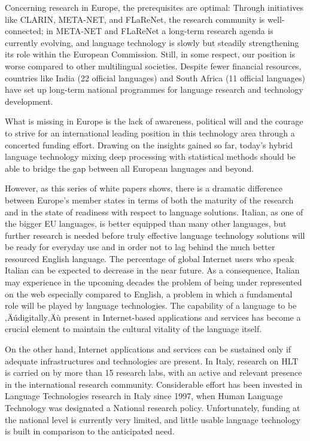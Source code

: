 \begin{multicols}{2}
Concerning research in Europe, the prerequisites are optimal: Through initiatives like CLARIN, META-NET, and FLaReNet, the research community is well-connected; in META-NET and FLaReNet a long-term research agenda is currently evolving, and language technology is slowly but steadily strengthening its role within the European Commission.  Still, in some respect, our position is worse compared to other multilingual societies. Despite fewer financial resources, countries like India (22 official languages) and South Africa (11 official languages) have set up long-term national programmes for language research and technology development.

What is missing in Europe is the lack of awareness, political will and the courage to strive for an international leading position in this technology area through a concerted funding effort.  Drawing on the insights gained so far, today's hybrid language technology mixing deep processing with statistical methods should be able to bridge the gap between all European languages and beyond.

However, as this series of white papers shows, there is a dramatic difference between Europe's member states in terms of both the maturity of the research and in the state of readiness with respect to language solutions. Italian, as one of the bigger EU languages, is better equipped than many other languages, but further research is needed before truly effective language technology solutions will be ready for everyday use and in order not to lag behind the much better resourced English language. The percentage of global Internet users who speak Italian can be expected to decrease in the near future. As a consequence, Italian may experience in the upcoming decades the problem of being under represented on the web especially compared to English, a problem in which a fundamental role will be played by language technologies.  The capability of a language to be ‚Äúdigitally‚Äù present in Internet-based applications and services has become a crucial element to maintain the cultural vitality of the language itself.

On the other hand, Internet applications and services can be sustained only if adequate infrastructures and technologies are present.  In Italy, research on HLT is carried on by more than 15 research labs, with an active and relevant presence in the international research community.  Considerable effort has been invested in Language Technologies research in Italy since 1997, when Human Language Technology was designated a National research policy. Unfortunately, funding at the national level is currently very limited, and little usable language technology is built in comparison to the anticipated need.


\end{multicols}
